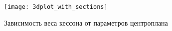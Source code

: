\begin{figure}[ht]
\captionsetup{justification=centering}
\caption{Зависимость веса кессона от параметров центроплана}
\texttt{[image: 3dplot\_with\_sections]}
\def\svgwidth{\textwidth}
%
\label{fig:Optimization3dplot}
\end{figure}


